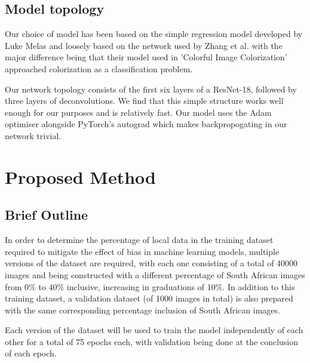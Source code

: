 \documentclass[conference]{IEEEtran}
\begin{document}
\subsection{Model topology}

Our choice of model has been based on the simple regression model developed by Luke Melas and loosely based on the network used by Zhang et al. \cite{zhang2016colorful} with the major difference being that their model used in 'Colorful Image Colorization'\cite{zhang2016colorful} approached colorization as a classification problem.

Our network topology consists of the first six layers of a ResNet-18, followed by three layers of deconvolutions. We find that this simple structure works well enough for our purposes and is relatively fast. Our model uses the Adam optimiser alongside PyTorch's autograd which makes backpropogating in our network trivial.

\section{Proposed Method}

%
%
%
%
%
%

\subsection{Brief Outline}

In order to determine the percentage of local data in the training dataset required to mitigate the effect of bias in machine learning models, multiple versions of the dataset are required, with each one consisting of a total of 40000 images and being constructed with a different percentage of South African images from 0\% to 40\% inclusive, increasing in graduations of 10\%. In addition to this training dataset, a validation dataset (of 1000 images in total) is also prepared with the same corresponding percentage inclusion of South African images.

Each version of the dataset will be used to train the model independently of each other for a total of 75 epochs each, with validation being done at the conclusion of each epoch. 
\end{document}
